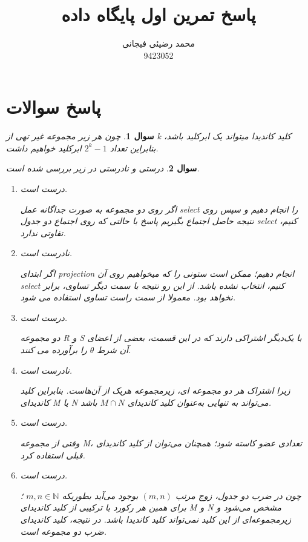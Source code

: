 \documentclass[10pt]{article}
\title{پاسخ تمرین اول پایگاه داده}
\author{محمد رضیئی فیجانی\\ 9423052}
\newtheorem{question}{سوال}
\begin{document}
\maketitle

\section{پاسخ سوالات}\label{chpt1}
\begin{question}
	چون هر زیر مجموعه غیر تهی از k کلید کاندیدا میتواند یک ابرکلید باشد، بنابراین تعداد 
	$2^k - 1$
	ابرکلید خواهیم داشت.
\end{question}
\begin{question}
درستی و نادرستی در زیر بررسی شده است.
\begin{enumerate}
	\item
	درست است.
	
	اگر روی دو مجموعه به صورت جداگانه عمل select را انجام دهیم و سپس روی نتیجه حاصل اجتماع بگیریم پاسخ با حالتی که روی اجتماع دو جدول select کنیم، تفاوتی ندارد.
	
	\item
	نادرست است.
	
	اگر ابتدای projection انجام دهیم؛ ممکن است ستونی را که میخواهیم روی آن select کنیم، انتخاب نشده باشد. از این رو نتیجه با سمت دیگر تساوی، برابر نخواهد بود. معمولا از سمت راست تساوی استفاده می شود.
	
	\item
	درست است.
	
	دو مجموعه R  و S با یک‌دیگر اشتراکی دارند که در این قسمت، بعضی از اعضای آن شرط $\theta$ را برآورده می کنند.
	
	\item
	نادرست است.
	
	زیرا اشتراک هر دو مجموعه ای، زیرمجموعه هریک از آن‌هاست. بنابراین کلید کاندیدای M یا N می‌تواند به تنهایی به‌عنوان کلید کاندیدای $M \cap N$ باشد.
	
	\item
درست است.

وقتی از مجموعه M، تعدادی عضو کاسته شود؛ همچنان می‌توان از کلید کاندیدای قبلی استفاده کرد.
	
	\item
درست است.

چون 	در ضرب دو جدول، زوج مرتب $(m,n)$ بوجود می‌آید بطوریکه
 $m,n \in \mathbb{N} $
 ؛ برای همین هر رکورد با ترکیبی از کلید کاندیدای M و  N مشخص می‌شود و زیرمجموعه‌ای از این کلید نمی‌تواند کلید کاندیدا باشد. در نتیجه، کلید کاندیدای ضرب دو مجموعه است.
	
	
	
	
\end{enumerate}
\end{question}
\end{document}
